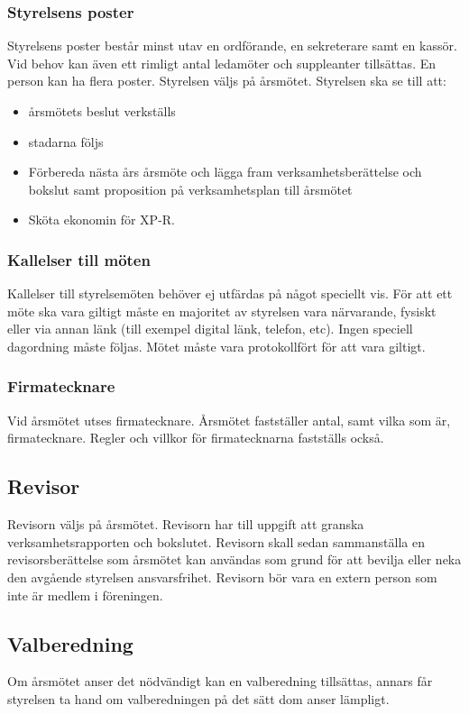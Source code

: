 \documentclass{article}
\begin{document}
\subsubsection{Styrelsens poster}

Styrelsens poster består minst utav en ordförande, en sekreterare samt en kassör.
Vid behov kan även ett rimligt antal ledamöter och suppleanter tillsättas.
En person kan ha flera poster.
Styrelsen väljs på årsmötet.
Styrelsen ska se till att:
\begin{itemize}[noitemsep]
    \item årsmötets beslut verkställs
    \item stadarna följs
    \item Förbereda nästa års årsmöte och lägga fram verksamhetsberättelse och bokslut samt proposition på verksamhetsplan till årsmötet
    \item Sköta ekonomin för XP-R.
\end{itemize}


\subsubsection{Kallelser till möten}
Kallelser till styrelsemöten behöver ej utfärdas på något speciellt vis. För att ett möte ska vara giltigt måste en majoritet av styrelsen vara närvarande, fysiskt eller via annan länk (till exempel digital länk, telefon, etc). Ingen speciell dagordning måste följas. Mötet måste vara protokollfört för att vara giltigt.

\subsubsection{Firmatecknare}
Vid årsmötet utses firmatecknare. Årsmötet fastställer antal, samt vilka som är, firmatecknare. Regler och villkor för firmatecknarna fastställs också. 

\subsection{Revisor}
Revisorn väljs på årsmötet. Revisorn har till uppgift att granska verksamhetsrapporten och bokslutet. Revisorn skall sedan sammanställa en revisorsberättelse som årsmötet kan användas som grund för att bevilja eller neka den avgående styrelsen ansvarsfrihet. Revisorn bör vara en extern person som inte är medlem i föreningen.

\subsection{Valberedning}
Om årsmötet anser det nödvändigt kan en valberedning tillsättas, annars får styrelsen ta hand om valberedningen på det sätt dom anser lämpligt. 
\end{document}
